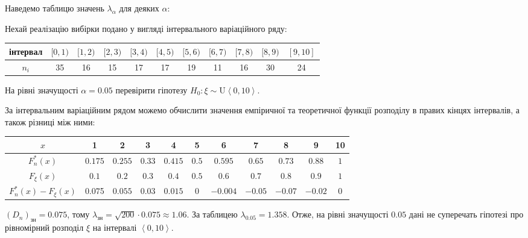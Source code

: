Наведемо таблицю значень $\lambda_\alpha$ для деяких $\alpha$:
\begin{center}
    
\end{center}

\begin{example}
    Нехай реалізацію вибірки подано у вигляді інтервального 
    варіаційного ряду:
    \begin{center}
        \begin{tabular}{*{11}{|c}|}
            \hline
            інтервал & $[0,1)$ & $[1,2)$ & $[2,3)$ & $[3,4)$ & $[4,5)$ & $[5,6)$ & $[6,7)$ & $[7,8)$ & $[8,9)$ & $[9,10]$ \\
            \hline
            $n_i$ & 35 & 16 & 15 & 17 & 17 & 19 & 11 & 16 & 30 & 24 \\
            \hline
        \end{tabular}
    \end{center}
    На рівні значущості $\alpha = 0.05$ перевірити гіпотезу $H_0: \xi \sim \mathrm{U}\left<0, 10\right>$.

    За інтервальним варіаційним рядом можемо обчислити значення емпіричної та теоретичної функції розподілу в правих кінцях інтервалів,
    а також різниці між ними:
    \begin{center}
        \begin{tabular}{*{11}{|c}|}
            \hline
            $x$ & 1 & 2 & 3 & 4 & 5 & 6 & 7 & 8 & 9 & 10 \\
            \hline
            $F_n^*(x)$ & $0.175$ & $0.255$ & $0.33$ & $0.415$ & $0.5$ & $0.595$ & $0.65$ & $0.73$ & $0.88$ & $1$ \\
            \hline
            $F_\xi(x)$ & $0.1$ & $0.2$ & $0.3$ & $0.4$ & $0.5$ & $0.6$ & $0.7$ & $0.8$ & $0.9$ & $1$ \\
            \hline
            $F_n^*(x) - F_\xi(x)$ & $0.07$5 & $0.055$ & $0.03$ & $0.015$ & $0$ & $-0.004$ & $-0.05$ & $-0.07$ & $-0.02$ & $0$ \\
            \hline
        \end{tabular}
    \end{center}
    $\left(D_n\right)_{\text{зн}} = 0.075$, тому $\lambda_{\text{зн}} = \sqrt{200} \cdot 0.075 \approx 1.06$.
    За таблицею $\lambda_{0.05} = 1.358$. Отже, на рівні значущості $0.05$ дані не суперечать гіпотезі про рівномірний
    розподіл $\xi$ на інтервалі $\left<0, 10\right>$. 
\end{example}